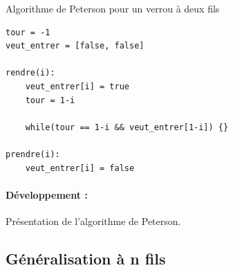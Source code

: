 \begin{algo}
	Algorithme de Peterson pour un verrou à deux fils \normalfont
	\begin{lstlisting}
tour = -1
veut_entrer = [false, false]

rendre(i): 
	veut_entrer[i] = true
	tour = 1-i

	while(tour == 1-i && veut_entrer[1-i]) {}

prendre(i): 
	veut_entrer[i] = false
	\end{lstlisting}
\end{algo}

\paragraph{Développement :} Présentation de l'algorithme de Peterson.

\subsection{Généralisation à n fils}

